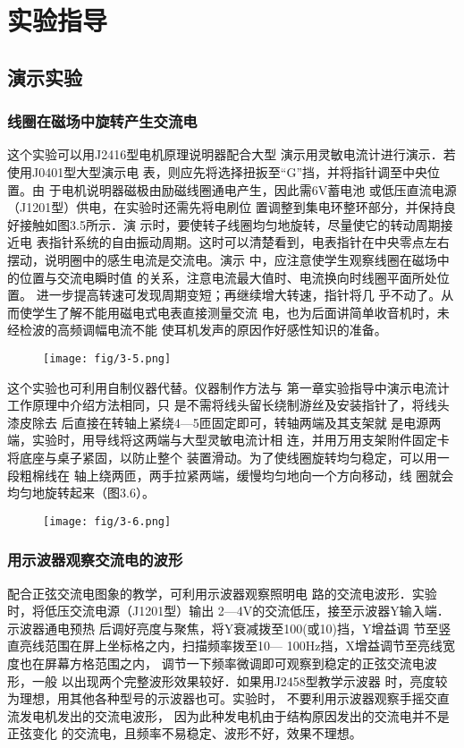 \section{实验指导}
\subsection{演示实验}
\subsubsection{线圈在磁场中旋转产生交流电}

这个实验可以用J2416型电机原理说明器配合大型
演示用灵敏电流计进行演示．若使用J0401型大型演示电
表，则应先将选择扭扳至“G”挡，并将指针调至中央位置。由
于电机说明器磁极由励磁线圈通电产生，因此需6V蓄电池
或低压直流电源（J1201型）供电，在实验时还需先将电刷位
置调整到集电环整环部分，并保持良好接触如图3.5所示．演
示时，要使转子线圈均匀地旋转，尽量使它的转动周期接近电
表指针系统的自由振动周期。这时可以清楚看到，电表指针在中央零点左右摆动，说明圈中的感生电流是交流电。演示
中，应注意使学生观察线圈在磁场中的位置与交流电瞬时值
的关系，注意电流最大值时、电流换向时线圈平面所处位置。
进一步提高转速可发现周期变短；再继续增大转速，指针将几
乎不动了。从而使学生了解不能用磁电式电表直接测量交流
电，也为后面讲简单收音机时，未经检波的高频调幅电流不能
使耳机发声的原因作好感性知识的准备。
\begin{figure}[htp]
    \centering
\texttt{[image: fig/3-5.png]}
    \caption{}
\end{figure}

这个实验也可利用自制仪器代替。仪器制作方法与
第一章实验指导中演示电流计工作原理中介绍方法相同，只
是不需将线头留长绕制游丝及安装指针了，将线头漆皮除去
后直接在转轴上紧绕4—5匝固定即可，转轴两端及其支架就
是电源两端，实验时，用导线将这两端与大型灵敏电流计相
连，并用万用支架附件固定卡将底座与桌子紧固，以防止整个
装置滑动。为了使线圈旋转均匀稳定，可以用一段粗棉线在
轴上绕两匝，两手拉紧两端，缓慢均匀地向一个方向移动，线
圈就会均匀地旋转起来（图3.6）。

\begin{figure}[htp]
    \centering
\texttt{[image: fig/3-6.png]}
    \caption{}
\end{figure}

\subsubsection{用示波器观察交流电的波形}
配合正弦交流电图象的教学，可利用示波器观察照明电
路的交流电波形．实验时，将低压交流电源（J1201型）输出
2—4V的交流低压，接至示波器Y输入端．示波器通电预热
后调好亮度与聚焦，将Y衰减拨至100(或10)挡，Y增益调
节至竖直亮线范围在屏上坐标格之内，扫描频率拨至10—
100Hz挡，X增益调节至亮线宽度也在屏幕方格范围之内，
调节一下频率微调即可观察到稳定的正弦交流电波形，一般
以出现两个完整波形效果较好．如果用J2458型教学示波器
时，亮度较为理想，用其他各种型号的示波器也可。实验时，
不要利用示波器观察手摇交直流发电机发出的交流电波形，
因为此种发电机由于结构原因发出的交流电并不是正弦变化
的交流电，且频率不易稳定、波形不好，效果不理想。

